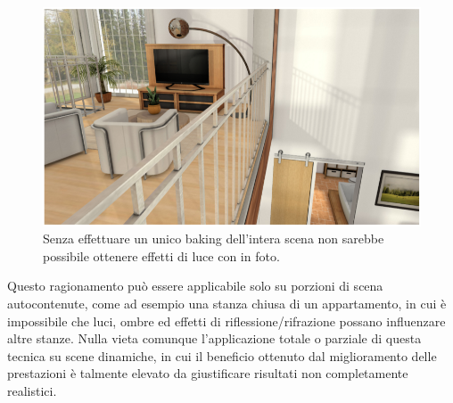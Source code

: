 \begin{figure}[htb]
 \centering
 \includegraphics[width=1\linewidth]{images/chapter_lrl/lrl_appl3.png}\hfill
 \caption[Applicabilità, scene autocontenute]{Senza effettuare un unico baking dell'intera scena non sarebbe possibile ottenere effetti di luce con in foto.}
 \label{fig:lrl_appl3}
\end{figure}
Questo ragionamento può essere applicabile solo su porzioni di scena autocontenute, come ad esempio una stanza chiusa di un appartamento, in cui è impossibile che luci, ombre ed effetti di riflessione/rifrazione possano influenzare altre stanze.
Nulla vieta comunque l’applicazione totale o parziale di questa tecnica su scene dinamiche, in cui il beneficio ottenuto dal miglioramento delle prestazioni è talmente elevato da giustificare  risultati non completamente realistici. 